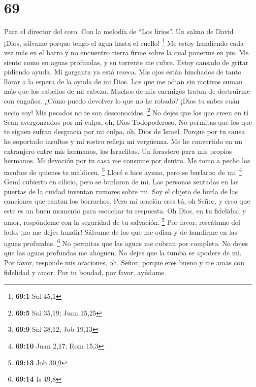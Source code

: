 \hypertarget{section-68}{%
\section{69}\label{section-68}}

Para el director del coro. Con la melodía de ``Los lirios''. Un salmo de
David  ¡Dios, sálvame porque tengo el agua hasta el cuello!
\footnote{\textbf{69:1} Sal 45,1}  Me estoy hundiendo cada
vez más en el barro y no encuentro tierra firme sobre la cual ponerme en
pie. Me siento como en aguas profundas, y su torrente me cubre.
 Estoy cansado de gritar pidiendo ayuda. Mi garganta ya está
reseca. Mis ojos están hinchados de tanto llorar a la espera de la ayuda
de mi Dios.  Los que me odian sin motivos suman más que los
cabellos de mi cabeza. Muchos de mis enemigos tratan de destruirme con
engaños. ¿Cómo puedo devolver lo que no he robado?  ¡Dios tu
sabes cuán necio soy! Mis pecados no te son desconocidos. \footnote{\textbf{69:5}
  Sal 35,19; Juan 15,25}  No dejes que los que creen en tí
Sean avergonzados por mi culpa, oh, Dios Todopoderoso. No permitas que
los que te siguen sufran desgracia por mi culpa, oh, Dios de Israel.
 Porque por tu causa he soportado insultos y mi rostro
refleja mi vergüenza.  Me he convertido en un extranjero
entre mis hermanos, los Israelitas. Un forastero para mis propios
hermanos.  Mi devoción por tu casa me consume por dentro. Me
tomo a pecho los insultos de quienes te maldicen. \footnote{\textbf{69:9}
  Sal 38,12; Job 19,13}  Lloré e hice ayuno, pero se
burlaron de mi. \footnote{\textbf{69:10} Juan 2,17; Rom 15,3}
 Gemí cubierto en cilicio, pero se burlaron de mi.
 Las personas sentadas en las puertas de la cuidad inventan
rumores sobre mi. Soy el objeto de burla de las canciones que cantan los
borrachos.  Pero mi oración eres tú, oh Señor, y creo que
este es un buen momento para escuchar tu respuesta. Oh Dios, en tu
fidelidad y amor, respóndeme con la seguridad de tu salvación.
\footnote{\textbf{69:13} Job 30,9}  Por favor, rescátame
del lodo, ¡no me dejes hundir! Sálvame de los que me odian y de hundirme
en las aguas profundas. \footnote{\textbf{69:14} Is 49,8} 
No permitas que las aguas me cubran por completo. No dejes que las aguas
profundas me ahoguen. No dejes que la tumba se apodere de mi.
 Por favor, responde mis oraciones, oh, Señor, porque eres
bueno y me amas con fidelidad y amor. Por tu bondad, por favor, ayúdame.

